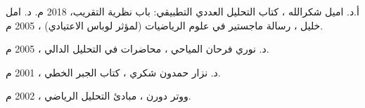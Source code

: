 \documentclass{arabicClass}
\begin{document}
	\setlength{\jot}{16pt}
	
	\belowdisplayskip=7pt
	\abovedisplayskip=7pt
	
	
	\amirifont
	
	
	
	\arabicfont
	\tableofcontents
	\clearpage
	
	
	
	
	
	\begin{thebibliography}{9}
		أ.د. اميل شكرالله ، كتاب التحليل العددي التطبيقي: باب نظرية التقريب، 2018 م.
		د. امل خليل ، رسالة ماجستير في علوم الرياضيات (لمؤثر لوباس الاعتيادي) ، 2005 م.
		
		د. نوري فرحان المياحي ، محاضرات في التحليل الدالي ، 2005 م.
		
		د. نزار حمدون شكري ، كتاب الجبر الخطي ، 2001 م.
		
		ووتر دورن ، مبادئ التحليل الرياضي ، 2002 م.
		
			
	\end{thebibliography}
\end{document}
